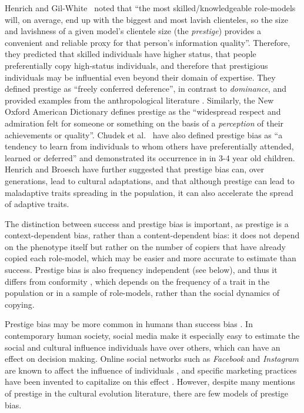 \documentclass[12pt]{extarticle}
\begin{document}
Henrich and Gil-White~\citep{prestige_evolution} noted that ``the most skilled/knowledgeable role-models will, on average, end up with the biggest and most lavish clienteles, so the size and lavishness of a given model's clientele size (the \emph{prestige}) provides a convenient and reliable proxy for that person's information quality''.
Therefore, they predicted that skilled individuals have higher status, that people preferentially copy high-status individuals, and therefore that prestigious individuals may be influential even beyond their domain of expertise. 
They defined prestige as ``freely conferred deference'', in contrast to \emph{dominance}, and provided examples from the anthropological literature \citep{prestige_evolution} .
Similarly, the New Oxford American Dictionary defines prestige as the ``widespread respect and admiration felt for someone or something on the basis of a \emph{perception} of their achievements or quality''.
Chudek et al.~\citep{prestige_cultural_learning} have also defined prestige bias as ``a tendency to learn from individuals to whom others have preferentially attended, learned or deferred'' and demonstrated its occurrence in in 3-4 year old children.
Henrich and Broesch \citep{fijian_social_bias} have further suggested that prestige bias can, over generations, lead to cultural adaptations, and that although prestige can lead to maladaptive traits spreading in the population, it can also accelerate the spread of adaptive traits. 

The distinction between success and prestige bias is important, as prestige is a context-dependent bias, rather than a content-dependent bias: it does not depend on the phenotype itself but rather on the number of copiers that have already copied each role-model, which may be easier and more accurate to estimate than success. 
Prestige bias is also frequency independent (see  below), and thus it differs from conformity \citep{Denton2020,Denton2021,Denton2022}, which depends on the frequency of a trait in the population or in a sample of role-models, rather than the social dynamics of copying.

Prestige bias may be more common in humans than success bias \citep{complexityPaper}.
In contemporary human society, social media make it especially easy to estimate the social and cultural influence individuals have over others, which can have an effect on decision making. Online social networks such as \emph{Facebook} and \emph{Instagram} are known to affect the influence of individuals \citep{social_influence,social_media,influence_analysis}, and specific marketing practices have been invented to capitalize on this effect \citep{facebook_marketing}.
However, despite many mentions of prestige in the cultural evolution literature, there are few models of prestige bias. 
\end{document}
